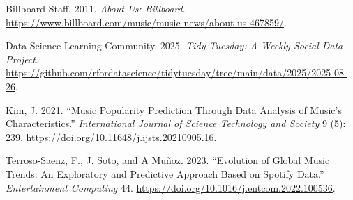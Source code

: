 \documentclass[
]{article}
\newlength{\cslhangindent}
\newenvironment{CSLReferences}[2] %
 {\begin{list}{}{%
  \setlength{\itemindent}{0pt}
  \setlength{\leftmargin}{0pt}
  \setlength{\parsep}{0pt}
  \ifodd #1
   \setlength{\leftmargin}{\cslhangindent}
   \setlength{\itemindent}{-1\cslhangindent}
  \fi
  \setlength{\itemsep}{#2\baselineskip}}}
 {\end{list}}
\begin{document}
\protect{}\label{refs}
\begin{CSLReferences}{1}{1}
Billboard Staff. 2011. \emph{About Us: Billboard}.
\url{https://www.billboard.com/music/music-news/about-us-467859/}.

Data Science Learning Community. 2025. \emph{Tidy Tuesday: A Weekly
Social Data Project}.
\url{https://github.com/rfordatascience/tidytuesday/tree/main/data/2025/2025-08-26}.

Kim, J. 2021. {``Music Popularity Prediction Through Data Analysis of
Music's Characteristics.''} \emph{International Journal of Science
Technology and Society} 9 (5): 239.
\url{https://doi.org/10.11648/j.ijsts.20210905.16}.

Terroso-Saenz, F., J. Soto, and A Muñoz. 2023. {``Evolution of Global
Music Trends: An Exploratory and Predictive Approach Based on Spotify
Data.''} \emph{Entertainment Computing} 44.
\url{https://doi.org/10.1016/j.entcom.2022.100536}.

\end{CSLReferences}
\end{document}
